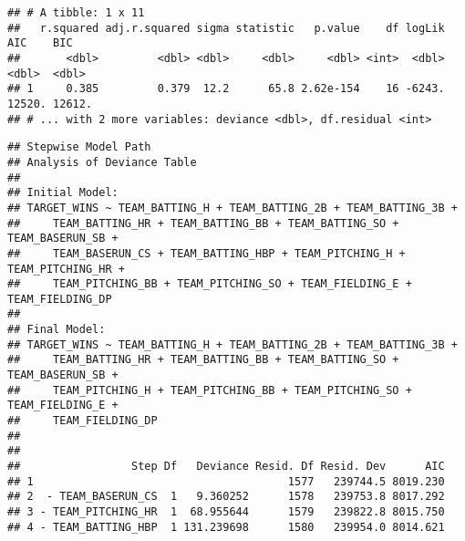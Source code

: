 \documentclass[
]{article}
\newenvironment{Shaded}{\begin{snugshade}}{\end{snugshade}}
\newcommand{\CommentTok}[1]{\textcolor[rgb]{0.56,0.35,0.01}{\textit{#1}}}
\newcommand{\DataTypeTok}[1]{\textcolor[rgb]{0.13,0.29,0.53}{#1}}
\newcommand{\DecValTok}[1]{\textcolor[rgb]{0.00,0.00,0.81}{#1}}
\newcommand{\KeywordTok}[1]{\textcolor[rgb]{0.13,0.29,0.53}{\textbf{#1}}}
\newcommand{\NormalTok}[1]{#1}
\newcommand{\OperatorTok}[1]{\textcolor[rgb]{0.81,0.36,0.00}{\textbf{#1}}}
\newcommand{\OtherTok}[1]{\textcolor[rgb]{0.56,0.35,0.01}{#1}}
\newcommand{\StringTok}[1]{\textcolor[rgb]{0.31,0.60,0.02}{#1}}
\begin{document}
\begin{verbatim}
## # A tibble: 1 x 11
##   r.squared adj.r.squared sigma statistic   p.value    df logLik    AIC    BIC
##       <dbl>         <dbl> <dbl>     <dbl>     <dbl> <int>  <dbl>  <dbl>  <dbl>
## 1     0.385         0.379  12.2      65.8 2.62e-154    16 -6243. 12520. 12612.
## # ... with 2 more variables: deviance <dbl>, df.residual <int>
\end{verbatim}

\begin{Shaded}
\end{Shaded}

\begin{verbatim}
## Stepwise Model Path 
## Analysis of Deviance Table
## 
## Initial Model:
## TARGET_WINS ~ TEAM_BATTING_H + TEAM_BATTING_2B + TEAM_BATTING_3B + 
##     TEAM_BATTING_HR + TEAM_BATTING_BB + TEAM_BATTING_SO + TEAM_BASERUN_SB + 
##     TEAM_BASERUN_CS + TEAM_BATTING_HBP + TEAM_PITCHING_H + TEAM_PITCHING_HR + 
##     TEAM_PITCHING_BB + TEAM_PITCHING_SO + TEAM_FIELDING_E + TEAM_FIELDING_DP
## 
## Final Model:
## TARGET_WINS ~ TEAM_BATTING_H + TEAM_BATTING_2B + TEAM_BATTING_3B + 
##     TEAM_BATTING_HR + TEAM_BATTING_BB + TEAM_BATTING_SO + TEAM_BASERUN_SB + 
##     TEAM_PITCHING_H + TEAM_PITCHING_BB + TEAM_PITCHING_SO + TEAM_FIELDING_E + 
##     TEAM_FIELDING_DP
## 
## 
##                 Step Df   Deviance Resid. Df Resid. Dev      AIC
## 1                                       1577   239744.5 8019.230
## 2  - TEAM_BASERUN_CS  1   9.360252      1578   239753.8 8017.292
## 3 - TEAM_PITCHING_HR  1  68.955644      1579   239822.8 8015.750
## 4 - TEAM_BATTING_HBP  1 131.239698      1580   239954.0 8014.621
\end{verbatim}

\begin{Shaded}
\end{Shaded}
\end{document}
